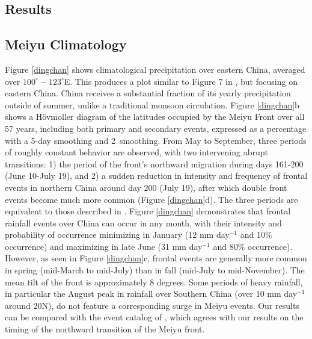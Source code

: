 \documentclass[draft,grl]{AGUTeX}
\begin{document}
\begin{article}
\section{Results}	
	
\subsection{Meiyu Climatology}	

	Figure \ref{dingchan} shows climatological precipitation over eastern China, averaged over $100^\circ-123^\circ$E. This produces a plot similar to Figure 7 in \citet{Ding2005}, but focusing on eastern China. China receives a substantial fraction of its yearly precipitation outside of summer, unlike a traditional monsoon circulation. Figure \ref{dingchan}b shows a H\"ovmoller diagram of the latitudes occupied by the Meiyu Front over all 57 years, including both primary and secondary events, expressed as a percentage with a 5-day smoothing and 2\textdegree\ smoothing. From May to September, three periods of roughly constant behavior are observed, with two intervening abrupt transitions:  1) the period of the front's northward migration during days 161-200 (June 10-July 19), and 2) a sudden reduction in intensity and frequency of frontal events in northern China around day 200 (July 19), after which double front events become much more common (Figure \ref{dingchan}d). The three periods are equivalent to those described in \citet{Ding2005}. Figure \ref{dingchan} demonstrates that frontal rainfall events over China can occur in any month, with their intensity and probability of occurrence minimizing in January (12 mm day$^{-1}$ and 10\% occurrence) and maximizing in late June (31 mm day$^{-1}$ and 80\% occurrence). However, as seen in Figure \ref{dingchan}c, frontal events are generally more common in spring (mid-March to mid-July) than in fall (mid-July to mid-November). The mean tilt of the front is approximately 8 degrees. Some periods of heavy rainfall, in particular the August peak in rainfall over Southern China (over 10 mm day$^{-1}$ around 20\textdegree N), do not feature a corresponding surge in Meiyu events. Our results can be compared with the event catalog of \citet{Xu2009}, which agrees with our results on the timing of the northward transition of the Meiyu front.
		

\end{article}
\end{document}
